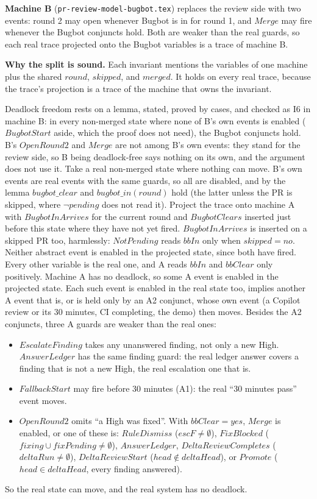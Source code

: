 \documentclass{article}
\begin{document}
\textbf{Machine B} (\texttt{pr-review-model-bugbot.tex}) replaces the review
side with two events: round 2 may open whenever Bugbot is in for round 1, and
$Merge$ may fire whenever the Bugbot conjuncts hold. Both are weaker than the
real guards, so each real trace projected onto the Bugbot variables is a trace
of machine B.

\textbf{Why the split is sound.} Each invariant mentions the variables of one
machine plus the shared $round$, $skipped$, and $merged$. It holds on every
real trace, because the trace's projection is a trace of the machine that owns
the invariant.

Deadlock freedom rests on a lemma, stated, proved by cases, and checked as I6
in machine B: in every non-merged state where none of B's own events is
enabled ($BugbotStart$ aside, which the proof does not need), the Bugbot
conjuncts hold. B's $OpenRound2$ and $Merge$ are not among B's own events:
they stand for the review side, so B being deadlock-free says nothing on its
own, and the argument does not use it. Take a real non-merged state where
nothing can move. B's own events are real events with the same guards, so all
are disabled, and by the lemma $bugbot\_clear$ and $bugbot\_in(round)$ hold
(the latter unless the PR is skipped, where $\lnot pending$ does not read it).
Project the trace onto machine A with $BugbotInArrives$ for the current round
and $BugbotClears$ inserted just before this state where they have not yet
fired. $BugbotInArrives$ is inserted on a skipped PR too, harmlessly:
$NotPending$ reads $bbIn$ only when $skipped = no$. Neither abstract event is
enabled in the projected state, since both have fired. Every other variable is
the real one, and A reads $bbIn$ and $bbClear$ only positively. Machine A has
no deadlock, so some A event is enabled in the projected state. Each such
event is enabled in the real state too, implies another A event that is, or
is held only by an A2 conjunct, whose own event (a Copilot review or its 30
minutes, CI completing, the demo) then moves. Besides the A2 conjuncts, three
A guards are weaker than the real ones:
\begin{itemize}
\item $EscalateFinding$ takes any unanswered finding, not only a new High.
  $AnswerLedger$ has the same finding guard: the real ledger answer covers a
  finding that is not a new High, the real escalation one that is.
\item $FallbackStart$ may fire before 30 minutes (A1): the real ``30 minutes
  pass'' event moves.
\item $OpenRound2$ omits ``a High was fixed''. With $bbClear = yes$, $Merge$
  is enabled, or one of these is: $RuleDismiss$ ($escF \neq \emptyset$),
  $FixBlocked$ ($fixing \cup fixPending \neq \emptyset$), $AnswerLedger$,
  $DeltaReviewCompletes$ ($deltaRun \neq \emptyset$), $DeltaReviewStart$
  ($head \notin deltaHead$), or $Promote$ ($head \in deltaHead$, every finding
  answered).
\end{itemize}
So the real state can move, and the real system has no deadlock.
\end{document}
